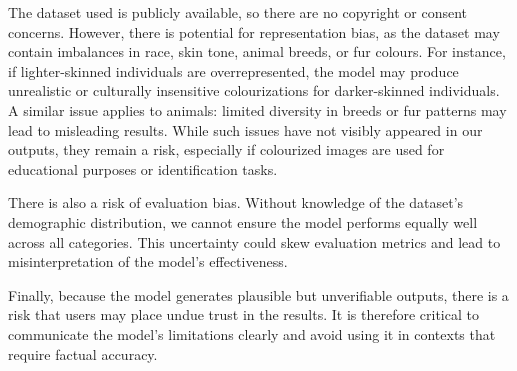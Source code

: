 \documentclass{article} %
\begin{document}
The dataset used is publicly available, so there are no copyright or consent concerns. However, there is potential for representation bias, as the dataset may contain imbalances
in race, skin tone, animal breeds, or fur colours. For instance, if lighter-skinned individuals are overrepresented, the model may produce unrealistic or culturally insensitive colourizations 
for darker-skinned individuals. A similar issue applies to animals: limited diversity in breeds or fur patterns may lead to misleading results. While such issues have not visibly appeared in 
our outputs, they remain a risk, especially if colourized images are used for educational purposes or identification tasks.

There is also a risk of evaluation bias. Without knowledge of the dataset's demographic distribution, we cannot ensure the model performs equally well across all categories. This 
uncertainty could skew evaluation metrics and lead to misinterpretation of the model's effectiveness.

Finally, because the model generates plausible but unverifiable outputs, there is a risk that users may place undue trust in the results. It is therefore critical to communicate the model's 
limitations clearly and avoid using it in contexts that require factual accuracy.

\label{last_page}

\newpage


\end{document}
